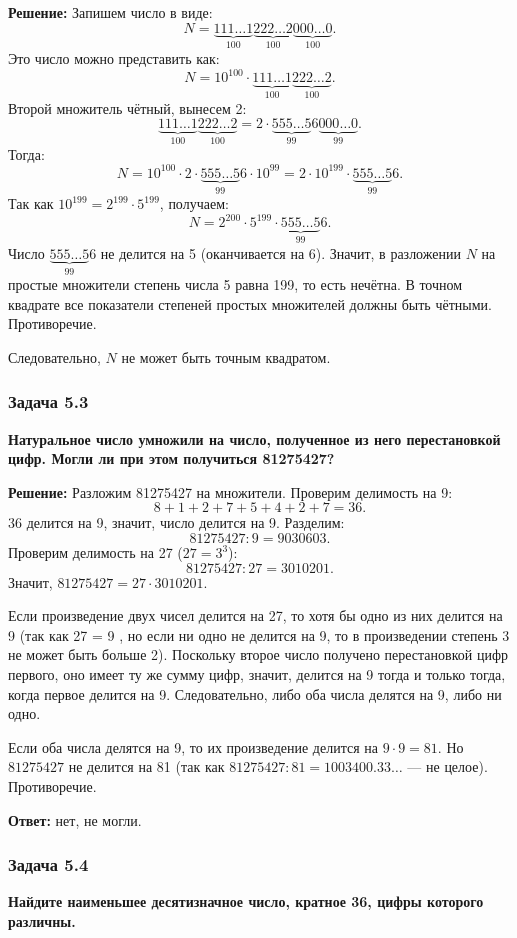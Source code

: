 \documentclass[12pt, a4paper]{article}
\begin{document}
\textbf{Решение:}
Запишем число в виде:
\[
N = \underbrace{111\ldots1}_{100} \underbrace{222\ldots2}_{100} \underbrace{000\ldots0}_{100}.
\]
Это число можно представить как:
\[
N = 10^{100} \cdot \underbrace{111\ldots1}_{100} \underbrace{222\ldots2}_{100}.
\]
Второй множитель чётный, вынесем 2:
\[
\underbrace{111\ldots1}_{100} \underbrace{222\ldots2}_{100} = 2 \cdot \underbrace{555\ldots5}_{99}6 \underbrace{000\ldots0}_{99}.
\]
Тогда:
\[
N = 10^{100} \cdot 2 \cdot \underbrace{555\ldots5}_{99}6 \cdot 10^{99} = 2 \cdot 10^{199} \cdot \underbrace{555\ldots5}_{99}6.
\]
Так как $10^{199} = 2^{199} \cdot 5^{199}$, получаем:
\[
N = 2^{200} \cdot 5^{199} \cdot \underbrace{555\ldots5}_{99}6.
\]
Число $\underbrace{555\ldots5}_{99}6$ не делится на 5 (оканчивается на 6). Значит, в разложении $N$ на простые множители степень числа 5 равна 199, то есть нечётна. В точном квадрате все показатели степеней простых множителей должны быть чётными. Противоречие.

Следовательно, $N$ не может быть точным квадратом.

\subsubsection*{Задача 5.3}
\textbf{Натуральное число умножили на число, полученное из него перестановкой цифр. Могли ли при этом получиться 81275427?}

\textbf{Решение:}
Разложим 81275427 на множители. Проверим делимость на 9:
\[
8 + 1 + 2 + 7 + 5 + 4 + 2 + 7 = 36.
\]
36 делится на 9, значит, число делится на 9. Разделим:
\[
81275427 : 9 = 9030603.
\]
Проверим делимость на 27 ($27 = 3^3$):
\[
81275427 : 27 = 3010201.
\]
Значит, $81275427 = 27 \cdot 3010201$.

Если произведение двух чисел делится на 27, то хотя бы одно из них делится на 9 (так как 27 = 9 , но если ни одно не делится на 9, то в произведении степень 3 не может быть больше 2). Поскольку второе число получено перестановкой цифр первого, оно имеет ту же сумму цифр, значит, делится на 9 тогда и только тогда, когда первое делится на 9. Следовательно, либо оба числа делятся на 9, либо ни одно.

Если оба числа делятся на 9, то их произведение делится на $9 \cdot 9 = 81$. Но $81275427$ не делится на 81 (так как $81275427 : 81 = 1003400.33\ldots$ — не целое). Противоречие.

\textbf{Ответ:} нет, не могли.

\subsubsection*{Задача 5.4}
\textbf{Найдите наименьшее десятизначное число, кратное 36, цифры которого различны.}
\end{document}
